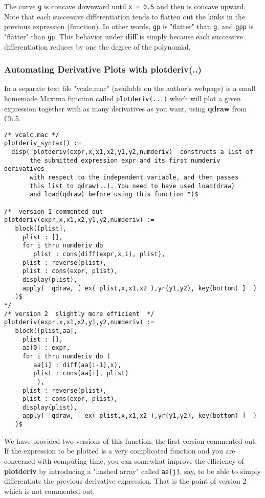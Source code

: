 \documentclass[12pt]{article}
\begin{document}
\smallskip
The curve \verb|g| is concave downward until \verb|x = 0.5| and then is concave upward.
Note that each successive differentiation tends to flatten out the kinks in the previous
  expression (function). In other words, \verb|gp| is "flatter" than \verb|g|, and
  \verb|gpp| is "flatter" than \verb|gp|.
This behavior under \textbf{diff} is simply because each successive differentiation
  reduces by one the degree of the polynomial.
\subsubsection{Automating Derivative Plots with plotderiv(..)}
In a separate text file "vcalc.mac" (available on the author's webpage)
  is a small homemade Maxima function called \verb|plotderiv(...)| which
  will plot a given expression together with as many derivatives as you
  want, using \textbf{qdraw} from Ch.5.
  

\small
\begin{verbatim}
/* vcalc.mac */
plotderiv_syntax() :=
  disp("plotderiv(expr,x,x1,x2,y1,y2,numderiv)  constructs a list of
       the submitted expression expr and its first numderiv derivatives
       with respect to the independent variable, and then passes
       this list to qdraw(..). You need to have used load(draw)
       and load(qdraw) before using this function ")$

/*  version 1 commented out
plotderiv(expr,x,x1,x2,y1,y2,numderiv) :=
   block([plist],
     plist : [],
     for i thru numderiv do
        plist : cons(diff(expr,x,i), plist),
     plist : reverse(plist),
     plist : cons(expr, plist),
     display(plist),
     apply( 'qdraw, [ ex( plist,x,x1,x2 ),yr(y1,y2), key(bottom) ]  )
   )$   
*/
/* version 2  slightly more efficient  */ 
plotderiv(expr,x,x1,x2,y1,y2,numderiv) :=
   block([plist,aa],
     plist : [],
     aa[0] : expr,
     for i thru numderiv do (
        aa[i] : diff(aa[i-1],x),
        plist : cons(aa[i], plist)
         ),
     plist : reverse(plist),
     plist : cons(expr, plist),
     display(plist),
     apply( 'qdraw, [ ex( plist,x,x1,x2 ),yr(y1,y2), key(bottom) ]  )
   )$
\end{verbatim}
\normalsize
We have provided two versions of this function, the first version commented out.
If the expression to be plotted is a very complicated function and you are
  concerned with computing time, you can somewhat improve the efficiency of
  \textbf{plotderiv} by introducing a "hashed array" called \verb|aa[j]|, say,
  to be able to simply differentiate the previous derivative expression.
That is the point of version 2 which is not commented out.  
\end{document}
